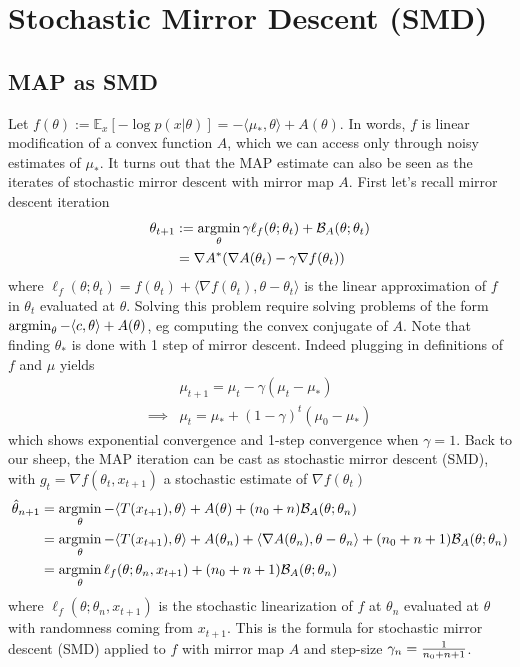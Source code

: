 \documentclass{article}
\newcommand*{\expect}[2][]{\ensuremath{\mathbb{E}_{#1} \left[ #2 \right] }} %
\newcommand{\logpart}{A}
\newcommand{\conj}{\logpart^*}
\newcommand{\bregman}{\cB_\logpart}
\newcommand{\natp}{\theta}
\newcommand{\linear}{\ell} %
\newcommand{\lr}{\gamma} %
\begin{document}
\section{Stochastic Mirror Descent (SMD)}
\subsection{MAP as SMD}
Let $f(\natp) := \expect[x]{-\log p(x|\natp)} = - \langle \mu_*, \natp\rangle + \logpart(\natp)$. In words, $f$ is linear modification of a convex function $\logpart$, which we can access only through noisy estimates of $\mu_*$. It turns out that the MAP estimate can also be seen as the iterates of stochastic mirror descent with mirror map $\logpart$. First let's recall mirror descent iteration
\begin{align}
	\natp_{t+1} 
	&:= \argmin_\natp \lr \linear_f(\natp; \natp_t) + \bregman(\natp ; \natp_t)  \\
	& = \nabla \conj (\nabla \logpart(\natp_t) - \lr \nabla f(\natp_t))
\end{align}
where $\linear_f(\natp; \natp_t) = f(\natp_t) + \langle \nabla f(\natp_t), \natp - \natp_t \rangle$ is the linear approximation of $f$ in $\natp_t$ evaluated at $\natp$. Solving this problem require solving problems of the form $\argmin_\natp - \langle c, \natp \rangle + \logpart(\natp)$, eg computing the convex conjugate of $\logpart$. 
Note that finding $\natp_*$ is done with 1 step of mirror descent. Indeed plugging in definitions of $f$ and $\mu$ yields
\begin{align}
	&\mu_{t+1}  = \mu_t - \lr (\mu_t - \mu_*) \\
	\implies &\mu_t  = \mu_* + (1- \lr)^t (\mu_0 - \mu_*)
\end{align}
which shows exponential convergence and 1-step convergence when $\lr =1$. Back to our sheep, the MAP iteration can be cast as stochastic mirror descent (SMD),  with $g_t = \nabla f(\natp_t, x_{t+1})$ a stochastic estimate  of $\nabla f(\natp_t)$
\begin{align}
    \hat \natp_{n+1} 
    &= \argmin_\natp 
    - \langle T(x_{t+1}), \natp \rangle  + \logpart(\natp) + (n_0 + n) \bregman(\natp ; \natp_n) \\
    &= \argmin_\natp - \langle T(x_{t+1}), \natp \rangle   + \logpart(\natp_n) + \langle \nabla \logpart(\natp_n)  , \natp - \natp_n \rangle + (n_0+n + 1) \bregman(\natp ; \natp_n) \\
    &= \argmin_\natp \linear_f(\natp;\natp_n, x_{t+1}) + (n_0 + n + 1) \bregman(\natp ; \natp_n)
\end{align}
where $\linear_f(\natp;\natp_n, x_{t+1})$ is the stochastic linearization of $f$ at $\natp_n$ evaluated at $\natp$ with randomness coming from $x_{t+1}$. This is the formula for stochastic mirror descent (SMD) applied to $f$ with mirror map $\logpart$ and step-size $\gamma_n = \frac{1}{n_0 + n + 1}$.
\end{document}

